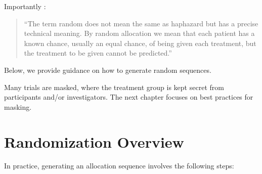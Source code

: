 \documentclass[
]{book}
\begin{document}
Importantly \citep{Altman1999-zc}:

\begin{quote}
``The term random does not mean the same as haphazard but has a precise technical meaning. By random allocation we mean that each patient has a known chance, usually an equal chance, of being given each treatment, but the treatment to be given cannot be predicted.''
\end{quote}

Below, we provide guidance on how to generate random sequences.

Many trials are masked, where the treatment group is kept secret from participants and/or investigators. The next chapter focuses on best practices for masking.

\hypertarget{randomization_overview}{%
\section{Randomization Overview}\label{randomization_overview}}

In practice, generating an allocation sequence involves the following steps:
\end{document}
